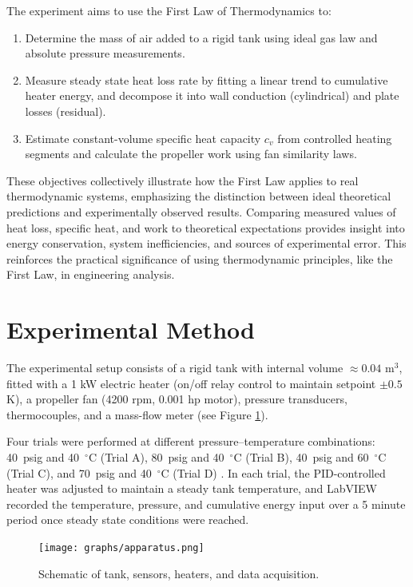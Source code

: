 \documentclass[12pt]{article}
\begin{document}
The experiment aims to use the First Law of Thermodynamics to:
\begin{enumerate}
    \item Determine the mass of air added to a rigid tank using ideal gas law and absolute pressure measurements.
    \item Measure steady state heat loss rate by fitting a linear trend to cumulative heater energy, and decompose it into wall conduction (cylindrical) and plate losses (residual).
    \item Estimate constant-volume specific heat capacity $c_v$ from controlled heating segments and calculate the propeller work using fan similarity laws.
\end{enumerate}

These objectives collectively illustrate how the First Law applies to real thermodynamic systems, emphasizing the distinction between ideal theoretical predictions and experimentally observed results. Comparing measured values of heat loss, specific heat, and work to theoretical expectations provides insight into energy conservation, system inefficiencies, and sources of experimental error. This reinforces the practical significance of using thermodynamic principles, like the First Law, in engineering analysis.

\section*{Experimental Method}
The experimental setup consists of a rigid tank with internal volume $\approx 0.04$ m$^3$, fitted with a 1 kW electric heater (on/off relay control to maintain setpoint $\pm 0.5$ K), a propeller fan (4200 rpm, 0.001 hp motor), pressure transducers, thermocouples, and a mass-flow meter (see Figure \ref{fig:apparatus}).

Four trials were performed at different pressure–temperature combinations: 40~psig and 40~$^{\circ}$C (Trial A), 80~psig and 40~$^{\circ}$C (Trial B), 40~psig and 60~$^{\circ}$C (Trial C), and 70~psig and 40~$^{\circ}$C (Trial D) \cite{che260_manual}. 
In each trial, the PID-controlled heater was adjusted to maintain a steady tank temperature, and LabVIEW recorded the temperature, pressure, and cumulative energy input over a 5 minute period once steady state conditions were reached.

\begin{figure}[H]
    \centering
    \texttt{[image: graphs/apparatus.png]}
    \caption{Schematic of tank, sensors, heaters, and data acquisition.}
    \label{fig:apparatus}
\end{figure}
\end{document}
